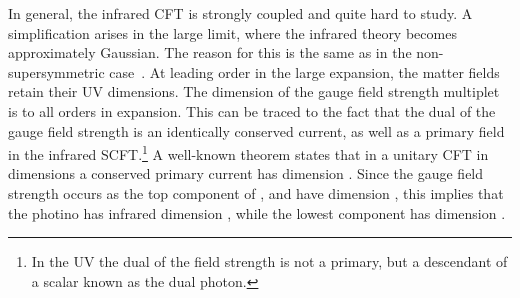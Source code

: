 \documentclass[a4paper,12pt, amsfonts, amssymb]{article}
\providecommand{\btheta}{{\bar \theta}}
\begin{document}
In general, the infrared CFT is strongly coupled and quite hard to study.
A simplification arises in the large \coordHE{} limit, where the infrared
theory becomes approximately Gaussian. The reason for this is the same as in
the non-supersymmetric case~\cite{BKWone}. At leading order in the large \coordHE{}
expansion, the matter fields retain their UV dimensions. The dimension
of the gauge field strength multiplet 
\myHighlight{$\Sigma$}\coordHE{} is \coordHE{} to all orders in \coordHE{} expansion. This can be traced to the fact that the dual of the gauge field strength is an identically conserved current, as well as a primary field in the infrared 
SCFT.\footnote{In the UV the dual of the field strength is not a primary, but a descendant of a scalar known as the dual photon.} A well-known
theorem states that in a unitary CFT in \coordHE{} dimensions a conserved primary
current has dimension \coordHE{}. Since the gauge field strength occurs as the
top component of \myHighlight{$\Sigma$}\coordHE{}, and \myHighlight{$\theta,\btheta$}\coordHE{} have dimension \coordHE{}, this
implies that the photino has infrared dimension \coordHE{}, while the lowest
component \myHighlight{$\chi$}\coordHE{} has dimension \coordHE{}.
\end{document}
